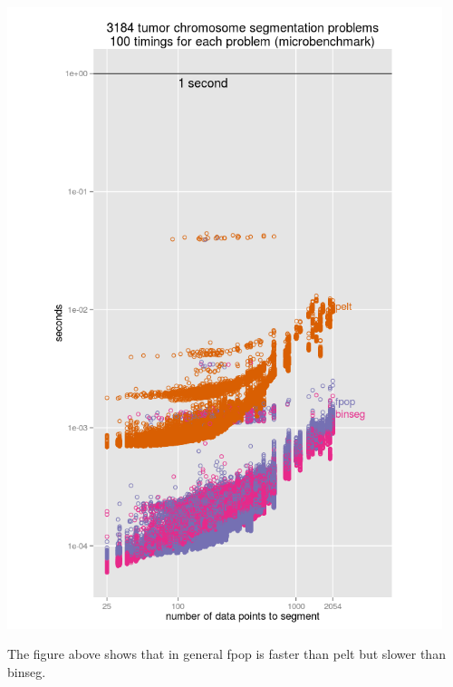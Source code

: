 \documentclass{article}
\begin{document}
\begin{center}
  \includegraphics[width=5in]{figure-microbenchmark-arrays}
\end{center}

The figure above shows that in general fpop is faster than pelt but
slower than binseg.
\end{document}
